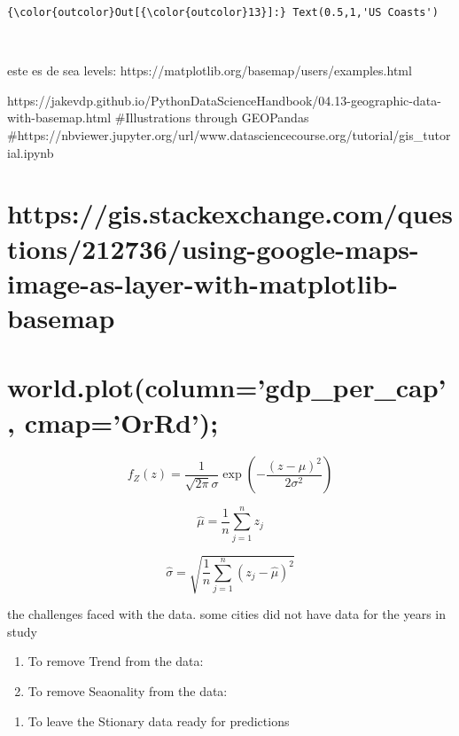 \documentclass[11pt]{article}
\providecommand{\tightlist}{%
      \setlength{\itemsep}{0pt}\setlength{\parskip}{0pt}}
\begin{document}
\begin{Verbatim}[commandchars=\\\{\}]
{\color{outcolor}Out[{\color{outcolor}13}]:} Text(0.5,1,'US Coasts')
\end{Verbatim}
            
    \begin{center}
    \end{center}
    { \hspace*{\fill} \\}
    
    este es de sea levels:
https://matplotlib.org/basemap/users/examples.html

https://jakevdp.github.io/PythonDataScienceHandbook/04.13-geographic-data-with-basemap.html
\#Illustrations through GEOPandas
\#https://nbviewer.jupyter.org/url/www.datasciencecourse.org/tutorial/gis\_tutorial.ipynb

\section{https://gis.stackexchange.com/questions/212736/using-google-maps-image-as-layer-with-matplotlib-basemap}\label{httpsgis.stackexchange.comquestions212736using-google-maps-image-as-layer-with-matplotlib-basemap}

\section{world.plot(column='gdp\_per\_cap',
cmap='OrRd');}\label{world.plotcolumngdp_per_cap-cmaporrd}

\[ f_Z(z) = \frac{1}{\sqrt{2\pi}\sigma} \exp{(-\frac{(z-\mu)^2}{2\sigma^2})} \]

\[ \hat{\mu} = \frac{1}{n} \sum_{j=1}^{n} z_j \]

\[ \hat{\sigma} = \sqrt{\frac{1}{n} \sum_{j=1}^{n} (z_j-\hat{\mu})^2} \]

the challenges faced with the data. some cities did not have data for
the years in study

\begin{enumerate}
\def\labelenumi{\alph{enumi})}
\tightlist
\item
  To remove Trend from the data:
\item
  To remove Seaonality from the data:
\end{enumerate}

\begin{enumerate}
\def\labelenumi{\Alph{enumi})}
\setcounter{enumi}{2}
\tightlist
\item
  To leave the Stionary data ready for predictions
\end{enumerate}
\end{document}
